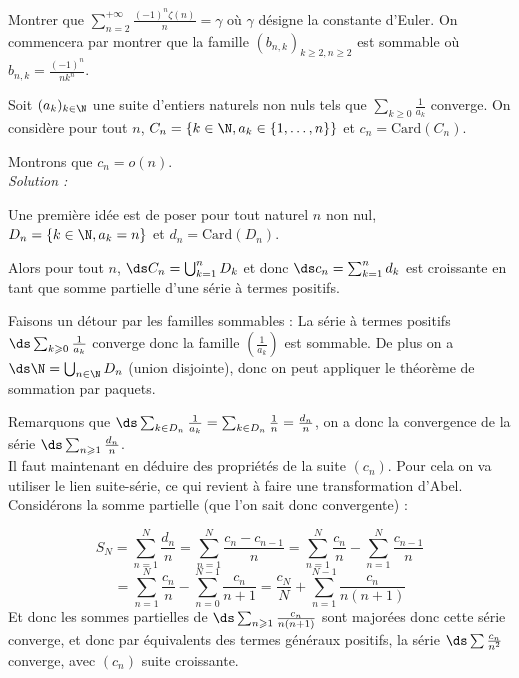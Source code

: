 \begin{exercice}
    Montrer que $\displaystyle\sum_{n=2}^{+\infty}\frac{(-1)^{n}\zeta(n)}{n}=\gamma$ où $\gamma$ désigne la constante d'Euler.
    On commencera par montrer que la famille $(b_{n,k})_{k\geqslant2,n\geqslant2}$ est sommable où $b_{n,k}=\frac{(-1)^{n}}{nk^{n}}$.
\end{exercice}

\begin{exercice}
    Soit $(a_{k})_{k\in \N}$ une suite d'entiers naturels non nuls tels que $\sum_{k\ge0}\frac{1}{a_{k}}$ converge.
    On considère pour tout $n$, $C_{n} = \{k\in\N, a_{k}\in\{1,\dots,n\}\}$ et $c_{n}=\text{Card}(C_{n})$.

    Montrons que $c_{n}=o(n)$. \\

\textit{Solution :}

    Une première idée est de poser pour tout naturel $n$ non nul, $D_{n}=\{k\in\N, a_{k}=n\}$ et $d_{n}=\text{Card}(D_{n})$.
    
    Alors pour tout $n$, $\ds C_{n}=\bigcup_{k=1}^{n}D_{k}$ 
    et donc $\ds c_{n}=\sum_{k=1}^{n}d_{k}$ est croissante en tant que somme partielle d'une série à termes positifs.

    Faisons un détour par les familles sommables :
    La série à termes positifs $\ds \sum_{k\geqslant0}\frac{1}{a_{k}}$ converge donc la famille $\left(\frac{1}{a_{k}}\right)$ est sommable.
    De plus on a $\ds \N=\bigcup_{n\in \N} D_{n}$ (union disjointe), donc on peut appliquer le théorème de sommation par paquets.

    Remarquons que $\ds \sum_{k\in D_{n}} \frac{1}{a_{k}}=\sum_{k\in D_{n}} \frac{1}{n}=\frac{d_{n}}{n}$, 
    on a donc la convergence de la série $\ds \sum_{n\geqslant1}\frac{d_{n}}{n}$. \\

    Il faut maintenant en déduire des propriétés de la suite $(c_{n})$.
    Pour cela on va utiliser le lien suite-série, ce qui revient à faire une transformation d'Abel.
    Considérons la somme partielle (que l'on sait donc convergente) :

    \[S_{N}=\sum_{n=1}^{N}\frac{d_{n}}{n}=\sum_{n=1}^{N}\frac{c_{n}-c_{n-1}}{n}=\sum_{n=1}^{N}\frac{c_{n}}{n}-\sum_{n=1}^{N}\frac{c_{n-1}}{n}\]
    \[=\sum_{n=1}^{N}\frac{c_{n}}{n}-\sum_{n=0}^{N-1}\frac{c_{n}}{n+1}=\frac{c_{N}}{N}+\sum_{n=1}^{N-1}\frac{c_{n}}{n(n+1)}\]
    Et donc les sommes partielles de $\ds \sum_{n\geqslant1}\frac{c_{n}}{n(n+1)}$ sont majorées donc cette série converge, 
    et donc par équivalents des termes généraux positifs, la série $\ds \sum \frac{c_{n}}{n^{2}}$ converge, avec $(c_{n})$ suite croissante.


\end{exercice}
